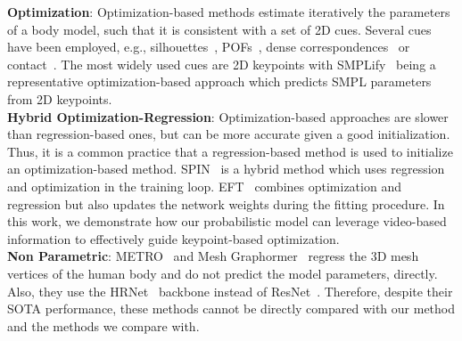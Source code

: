\documentclass[runningheads]{llncs}
\begin{document}
\vspace*{0.1cm}\noindent\textbf{Optimization}: Optimization-based methods estimate iteratively the parameters of a body model, such that it is consistent with a set of 2D cues. Several cues have been employed, e.g., silhouettes~\cite{lassner2017unite}, POFs~\cite{xiang2019monocular}, dense correspondences~\cite{guler2019holopose} or contact~\cite{muller2021self}. The most widely used cues are 2D keypoints with SMPLify~\cite{Bogo:ECCV:2016} being a representative optimization-based approach which predicts SMPL parameters from 2D keypoints. \\


\vspace*{0.1cm}\noindent\textbf{Hybrid Optimization-Regression}: Optimization-based approaches are slower than regression-based ones, but can be more accurate given a good initialization. Thus, it is a common practice that a regression-based method is used to initialize an optimization-based method. SPIN~\cite{kolotouros2019spin} is a hybrid method which uses regression and optimization in the training loop. EFT~\cite{joo2020eft} combines optimization and regression but also updates the network weights during the fitting procedure.
In this work, we demonstrate how our probabilistic model can leverage video-based information to effectively guide keypoint-based optimization. \\


\vspace*{0.1cm}\noindent\textbf{Non Parametric}:
METRO~\cite{lin2021end-to-end} and Mesh Graphormer~\cite{lin2021-mesh-graphormer} regress the 3D mesh vertices of the human body and do not predict the model parameters, directly. Also, they use the HRNet~\cite{Zhou_2019_CVPR} backbone instead of ResNet~\cite{7780459}. Therefore, despite their SOTA performance, these methods cannot be directly compared with our method and the methods we compare with. 
\end{document}
